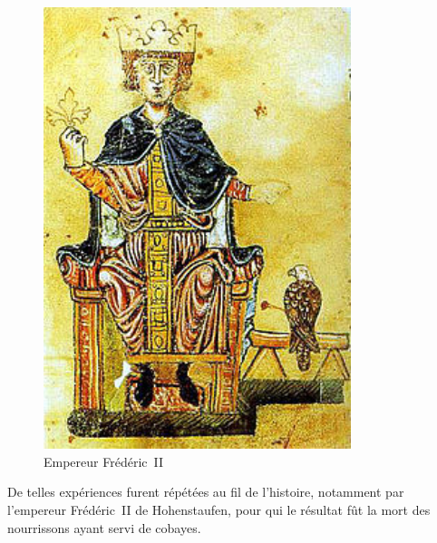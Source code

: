 \begin{minipage}[H]{0.49\linewidth}
  \begin{figure}[H]
  \centering
  \includegraphics[width=0.8\textwidth]{../resources/illustrations/fred-II}
  \caption{Empereur Frédéric~II}
  \end{figure}
\end{minipage}
\begin{minipage}[H]{0.5\linewidth}
De telles expériences furent répétées au fil de l'histoire, notamment
par l'empereur Frédéric~II de Hohenstaufen, pour qui le résultat fût
la mort des nourrissons ayant servi de cobayes\cite{ggcoulton-francis-to-dante}. 
\end{minipage}

